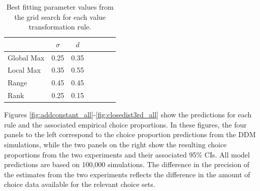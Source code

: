 \documentclass[11pt,a4paper]{article}
\begin{document}
\begin{table}[h]
\centering
\caption{Best fitting parameter values from the grid search for each value transformation rule.}
\begin{tabular}{lcccccc}
\toprule 
 & $\sigma$ & $d$ \\
\midrule
Global Max & 0.25 & 0.35  \\
Local Max & 0.35  & 0.55\\
Range & 0.45  & 0.45 \\
Rank & 0.25  & 0.15\\
\bottomrule
\end{tabular}
\label{table:chap1res3}
\end{table}








Figures \ref{fig:addconstant_all}-\ref{fig:closedist3rd_all} show the predictions for each rule and the associated empirical choice proportions. In these figures, the four panels to the left correspond to the choice proportion predictions from the DDM simulations, while the two panels on the right show the resulting choice proportions from the two experiments and their associated 95\% CIs. All model predictions are based on 100,000 simulations. The difference in the precision of the estimates from the two experiments reflects the difference in the amount of choice data available for the relevant choice sets.  
\end{document}
